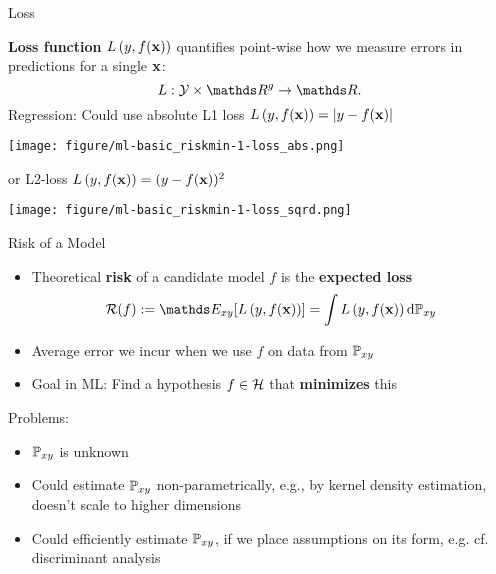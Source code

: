 \documentclass[11pt,compress,t,notes=noshow, xcolor=table]{beamer}
\begin{document}
\begin{vbframe}{Loss}

\textbf{Loss function} $L\left(y, f(\mathbf{x})\right)$ quantifies point-wise how we measure errors in predictions for a single $\mathbf{x}$:
    $$
    L: \Yspace \times \R^g \to \R.
    $$
Regression: Could use absolute L1 loss  $L\left(y, f(\mathbf{x})\right) = |y-f(\mathbf{x})|$





\begin{center}
\texttt{[image: figure/ml-basic\_riskmin-1-loss\_abs.png]}
\end{center}
or L2-loss $L\left(y, f(\mathbf{x})\right) = (y - f(\mathbf{x}))^2$
\begin{center}
\texttt{[image: figure/ml-basic\_riskmin-1-loss\_sqrd.png]}
\end{center}





\end{vbframe}


\begin{vbframe}{Risk of a Model}

\begin{itemize}
  \item Theoretical \textbf{risk} of a candidate model $f$ is the \textbf{expected loss}
  $$ \riskf := \E_{xy} [\Lxy] = \int \Lxy \text{d}\Pxy $$
  \item Average error we incur when we use $f$ on data from $\mathbb{P}_{xy}$
  \item Goal in ML: Find a hypothesis $f \in \mathcal{H}$ that \textbf{minimizes} this
\end{itemize}

\vfill

Problems: 

\begin{itemize}
\item $\mathbb{P}_{xy}$ is unknown
\item Could estimate $\mathbb{P}_{xy}$ non-parametrically, e.g., by kernel density estimation,  doesn't scale to higher dimensions
\item Could efficiently estimate $\mathbb{P}_{xy}$, if we place assumptions on its form, e.g. cf. discriminant analysis
\end{itemize}

\lz


\end{vbframe}
\end{document}
